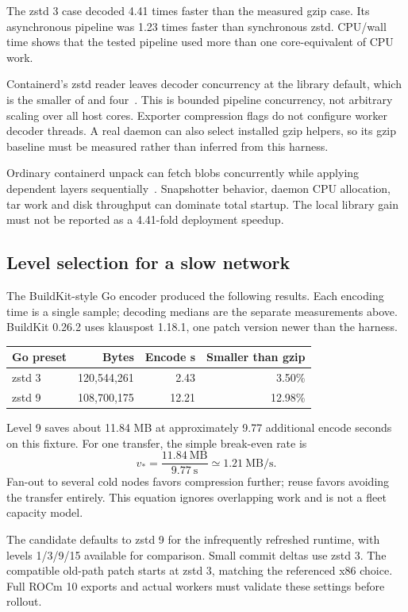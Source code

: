\documentclass[11pt,a4paper]{article}
\newcommand{\term}[1]{\texttt{\detokenize{#1}}}
\begin{document}
The zstd 3 case decoded 4.41 times faster than the measured gzip case. Its
asynchronous pipeline was 1.23 times faster than synchronous zstd. CPU/wall time
shows that the tested pipeline used more than one core-equivalent of CPU work.

Containerd's zstd reader leaves decoder concurrency at the library default,
which is the smaller of \term{GOMAXPROCS} and four~\cite{containerd,decoder}.
This is bounded pipeline concurrency, not arbitrary scaling over all host cores.
Exporter compression flags do not configure worker decoder threads. A real
daemon can also select installed gzip helpers, so its gzip baseline must be
measured rather than inferred from this harness.

Ordinary containerd unpack can fetch blobs concurrently while applying dependent
layers sequentially~\cite{unpacker}. Snapshotter behavior, daemon CPU allocation,
tar work and disk throughput can dominate total startup. The local library gain
must not be reported as a 4.41-fold deployment speedup.

\subsection{Level selection for a slow network}

The BuildKit-style Go encoder produced the following results. Each encoding time
is a single sample; decoding medians are the separate measurements above.
BuildKit 0.26.2 uses klauspost 1.18.1, one patch version newer than the harness.

\begin{tabularx}{\textwidth}{Xrrr}
\toprule
Go preset & Bytes & Encode s & Smaller than gzip \\
\midrule
zstd 3 & 120,544,261 & 2.43 & 3.50\% \\
zstd 9 & 108,700,175 & 12.21 & 12.98\% \\
\bottomrule
\end{tabularx}

Level 9 saves about 11.84 MB at approximately 9.77 additional encode seconds on
this fixture. For one transfer, the simple break-even rate is
\[
 v_* = \frac{11.84\ \mathrm{MB}}{9.77\ \mathrm{s}}
      \simeq 1.21\ \mathrm{MB/s}.
\]
Fan-out to several cold nodes favors compression further; reuse favors avoiding
the transfer entirely. This equation ignores overlapping work and is not a
fleet capacity model.

The candidate defaults to zstd 9 for the infrequently refreshed runtime, with
levels 1/3/9/15 available for comparison. Small commit deltas use zstd 3. The
compatible old-path patch starts at zstd 3, matching the referenced x86 choice.
Full ROCm 10 exports and actual workers must validate these settings before
rollout.
\end{document}
